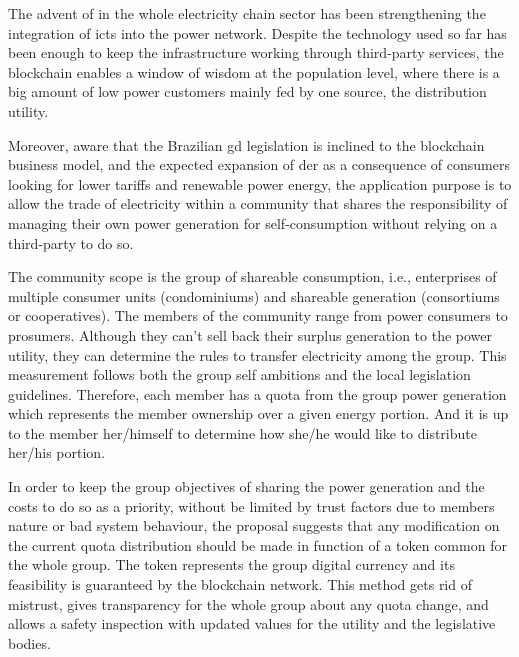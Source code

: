 

The advent of  in the whole electricity chain sector has been strengthening the integration of \glspl{ict} into the power network.
Despite the technology used so far has been enough to keep the infrastructure working through third-party services,
the blockchain enables a window of wisdom at the population level, where there is a big amount of low power customers mainly fed by one source, the distribution utility.

Moreover, aware that the Brazilian \acrfull{gd} legislation is inclined to the blockchain business model,
and the expected expansion of \acrfull{der} as a consequence of consumers looking for lower tariffs and renewable power energy,
the application purpose is to allow the trade of electricity within a community that shares the responsibility of managing their own power generation for self-consumption without relying on a third-party to do so.

The community scope is the group of shareable consumption, i.e., enterprises of multiple consumer units (condominiums) and shareable generation (consortiums or cooperatives).
The members of the community range from power consumers to prosumers.
Although they can't sell back their surplus generation to the power utility, they can determine the rules to transfer electricity among the group.
This measurement follows both the group self ambitions and the local legislation guidelines.
Therefore, each member has a quota from the group power generation which represents the member ownership over a given energy portion.
And it is up to the member her/himself to determine how she/he would like to distribute her/his portion.

In order to keep the group objectives of sharing the power generation and the costs to do so as a priority, without be limited by trust factors due to members nature or bad system behaviour, the proposal suggests that any modification on the current quota distribution should be made in function of a token common for the whole group.
The token represents the group digital currency and its feasibility is guaranteed by the blockchain network.
This method gets rid of mistrust, gives transparency for the whole group about any quota change, and allows a safety inspection with updated values for the utility and the legislative bodies.

